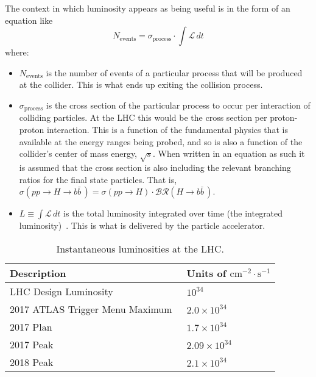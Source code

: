 The context in which luminosity appears as being useful is in the form of an equation like
\begin{equation}
 N_{\textrm{events}} = \sigma_{\textrm{process}} \cdot \int \mathscr{L}\,dt
 \label{eq:events_from_luminosity}
\end{equation}
where:
\begin{itemize}
 \item $N_{\text{events}}$ is the number of events of a particular process that will be produced at the collider.
       This is what ends up exiting the collision process.
 \item $\sigma_{\textrm{process}}$ is the cross section of the particular process to occur per interaction of colliding particles.
       At the \Gls{LHC} this would be the cross section per proton-proton interaction.
       This is a function of the fundamental physics that is available at the energy ranges being probed, and so is also a function of the collider's center of mass energy, $\sqrt{s}$.
       When written in an equation as such it is assumed that the cross section is also including the relevant branching ratios for the final state particles.
       That is, ${\sigma\left(pp \to H \to b\bar{b}\,\right) = \sigma\left(pp \to H\right) \cdot \mathcal{BR}\left(H \to b\bar{b}\,\right)}$.
 \item $L \equiv \int \mathscr{L}\,dt$ is the total luminosity integrated over time (the integrated luminosity)~\cite{Herr:941318}.
       This is what is delivered by the particle accelerator.
\end{itemize}

\begin{table}[htpb]
 \centering
 \caption{Instantaneous luminosities at the LHC.}
 \begin{tabular}{@{}ll@{}} \toprule
  Description                                                    & Units of $\textrm{cm}^{-2}\cdot\textrm{s}^{-1}$ \\ \midrule
  LHC Design Luminosity~\cite{Bruning:782076}                    & $10^{34}$                                       \\
  2017 ATLAS Trigger Menu Maximum~\cite{TWiki:MenuEvolution2017} & $2.0 \times 10^{34}$                            \\
  2017 Plan~\cite{Indico:MenuCoordination_2017Lumi}              & $1.7 \times 10^{34}$                            \\
  2017 Peak~\cite{TWiki:2017ATLASPeakLumi}                       & $2.09 \times 10^{34}$                           \\
  2018 Peak~\cite{TWiki:2018ATLASPeakLumi}                       & $2.1 \times 10^{34}$                            \\
  \bottomrule
 \end{tabular}\label{table:LHC_Luminosity_Goals}%
\end{table}

